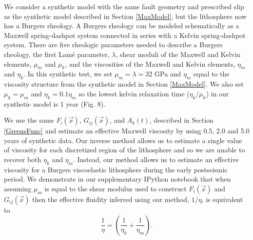 \documentclass[extra,mreferee]{gji}
\begin{document}
We consider a synthetic model with the same fault geometry and
prescribed slip as the synthetic model described in Section \ref{MaxModel}, but
the lithosphere now has a Burgers rheology.  A Burgers rheology can be
modeled schematically as a Maxwell spring-dashpot system connected in
series with a Kelvin spring-dashpot system. There are five rheologic
parameters needed to describe a Burgers rheology, the first Lam\'e
parameter, $\lambda$, shear moduli of the Maxwell and Kelvin elements,
$\mu_m$ and $\mu_k$, and the viscosities of the Maxwell and Kelvin
elements, $\eta_m$ and $\eta_k$.  In this synthetic test, we set
$\mu_m=\lambda=32$ GPa and $\eta_m$ equal to the viscosity structure
from the synthetic model in Section \ref{MaxModel}.  We also set $\mu_k=\mu_m$
and $\eta_k=0.1\eta_m$ so the lowest kelvin relaxation time
($\eta_k/\mu_k$) in our synthetic model is 1 year (Fig. 8).

We use the same $F_i(\vec{x})$, $G_{ij}(\vec{x})$, and $A_k(t)$,
described in Section \ref{GreensFunc} and estimate an effective
Maxwell viscosity by using 0.5, 2.0 and 5.0 years of synthetic data.
Our inverse method allows us to estimate a single value of viscosity
for each discretized region of the lithosphere and so we are unable to
recover both $\eta_k$ and $\eta_m$.  Instead, our method allows us to
estimate an effective viscosity for a Burgers viscoelastic lithosphere
during the early postseismic period.  We demonstrate in our
supplementary IPython notebook that when assuming $\mu_m$ is equal to
the shear modulus used to construct $F_i(\vec{x})$ and
$G_{ij}(\vec{x})$ then the effective fluidity inferred using our
method, $1/\eta$, is equivalent to
\begin{equation}\label{EquivalentBurgers}
\frac{1}{\eta} = \left(\frac{1}{\eta_k} + \frac{1}{\eta_m}\right).
\end{equation}
\end{document}
